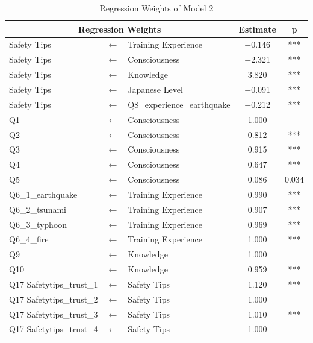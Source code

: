 \begin{table}[h]
  \caption{Regression Weights of Model 2}
  \label{table11}
  \centering
  \begin{tabular}{|l|c|l|c|c|}
 \hline
 \multicolumn{3}{|c|}{Regression Weights} & Estimate & p \\
 \hline
  Safety Tips & $\longleftarrow$ & Training Experience & $-$0.146 & *** \\
  Safety Tips & $\longleftarrow$ & Consciousness & $-$2.321 & *** \\
  Safety Tips & $\longleftarrow$ & Knowledge & 3.820 & *** \\
  Safety Tips & $\longleftarrow$ & Japanese Level & $-$0.091 & *** \\
  Safety Tips & $\longleftarrow$ & Q8\_experience\_earthquake & $-$0.212 & *** \\
  Q1              & $\longleftarrow$ & Consciousness & 1.000 &  \\
  Q2              & $\longleftarrow$ & Consciousness & 0.812 & *** \\
  Q3              & $\longleftarrow$ & Consciousness & 0.915 & *** \\
  Q4              & $\longleftarrow$ & Consciousness & 0.647 & *** \\
  Q5              & $\longleftarrow$ & Consciousness & 0.086 & 0.034 \\
  Q6\_1\_earthquake & $\longleftarrow$ & Training Experience & 0.990 & *** \\
  Q6\_2\_tsunami & $\longleftarrow$ & Training Experience & 0.907 & *** \\
  Q6\_3\_typhoon & $\longleftarrow$ & Training Experience & 0.969 & *** \\
  Q6\_4\_fire & $\longleftarrow$ & Training Experience & 1.000 & *** \\
  Q9             & $\longleftarrow$ & Knowledge & 1.000 & \\
  Q10           & $\longleftarrow$ & Knowledge & 0.959 & *** \\
  Q17 Safetytips\_trust\_1 & $\longleftarrow$ & Safety Tips & 1.120 & *** \\
  Q17 Safetytips\_trust\_2 & $\longleftarrow$ & Safety Tips & 1.000 & \\
  Q17 Safetytips\_trust\_3 & $\longleftarrow$ & Safety Tips & 1.010 & *** \\
  Q17 Safetytips\_trust\_4 & $\longleftarrow$ & Safety Tips & 1.000 & \\
 \hline
  \end{tabular}
\end{table}

